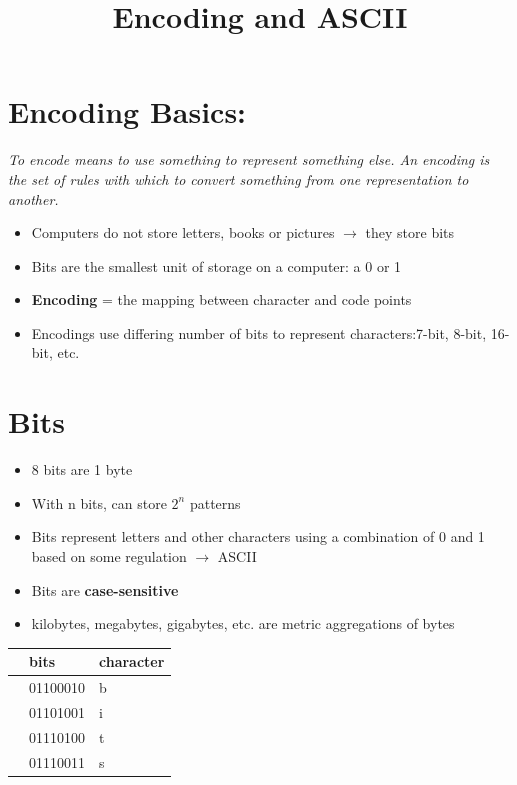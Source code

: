 \documentclass[]{article}
\title{Encoding and ASCII}
\author{}
\begin{document}
\maketitle


\section{Encoding Basics:} 

\textit{To encode means to use something to represent something else. An encoding is the set of rules with which to convert something from one representation to another.} 

\begin{itemize}
		
\item Computers do not store letters, books or pictures $\rightarrow$ they store bits
\item Bits are the smallest unit of storage on a computer: a 0 or 1
\item \textbf{Encoding} = the mapping between character and code points
\item Encodings use differing number of bits to represent characters:7-bit, 8-bit, 16-bit, etc.
		
\end{itemize}
	
\section{Bits} 
	
\begin{itemize}
\item 8 bits are 1 byte 
\item With n bits, can store $2^n$ patterns
\item Bits represent letters and other characters using a combination of 0 and 1 based on some regulation $\rightarrow$ ASCII
\item Bits are \textbf{case-sensitive}
\item kilobytes, megabytes, gigabytes, etc. are metric aggregations of bytes
	
\end{itemize}

\begin{tabular}{lll}
	& bits  & character \\
	\hline
	& 01100010 & b  \\
	& 01101001 & i \\
	& 01110100 & t \\
	& 01110011 & s \\
\end{tabular}
%
\end{document}
